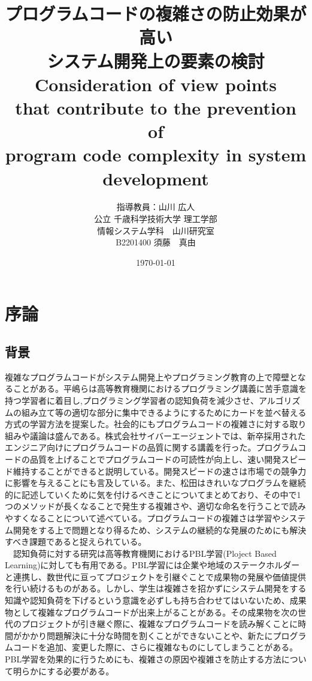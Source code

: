 \documentclass[12pt, a4paper]{jreport}
\begin{document}
    \title{プログラムコードの複雑さの防止効果が高い\\システム開発上の要素の検討\\Consideration of view points\\that contribute to the prevention of\\program code complexity in system development}
    \author{指導教員：山川 広人\\
    公立 千歳科学技術大学 理工学部\\
    情報システム学科　山川研究室\\
B2201400 須藤　真由}
\date{\today}

\maketitle
{}
\tableofcontents
\chapter{序論}

\section{背景}
複雑なプログラムコードがシステム開発上やプログラミング教育の上で障壁となることがある。平嶋ら\cite{haikei}は高等教育機関におけるプログラミング講義に苦手意識を持つ学習者に着目し,プログラミング学習者の認知負荷を減少させ、アルゴリズムの組み立て等の適切な部分に集中できるようにするためにカードを並べ替える方式の学習方法を提案した。社会的にもプログラムコードの複雑さに対する取り組みや議論は盛んである。株式会社サイバーエージェント\cite{CyberZ}では、新卒採用されたエンジニア向けにプログラムコードの品質に関する講義を行った。プログラムコードの品質を上げることでプログラムコードの可読性が向上し、速い開発スピード維持することができると説明している。開発スピードの速さは市場での競争力に影響を与えることにも言及している。また、松田\cite{kireina}はきれいなプログラムを継続的に記述していくために気を付けるべきことについてまとめており、その中で1つのメソッドが長くなることで発生する複雑さや、適切な命名を行うことで読みやすくなることについて述べている。プログラムコードの複雑さは学習やシステム開発をする上で問題となり得るため、システムの継続的な発展のためにも解決すべき課題であると捉えられている。
\\　認知負荷に対する研究は高等教育機関におけるPBL学習(Ploject Based Learning)に対しても有用である。PBL学習には企業や地域のステークホルダーと連携し、数世代に亘ってプロジェクトを引継ぐことで成果物の発展や価値提供を行い続けるものがある。しかし、学生は複雑さを招かずにシステム開発をする知識や認知負荷を下げるという意識を必ずしも持ち合わせてはいないため、成果物として複雑なプログラムコードが出来上がることがある。その成果物を次の世代のプロジェクトが引き継ぐ際に、複雑なプログラムコードを読み解くことに時間がかかり問題解決に十分な時間を割くことができないことや、新たにプログラムコードを追加、変更した際に、さらに複雑なものにしてしまうことがある。PBL学習を効果的に行うためにも、複雑さの原因や複雑さを防止する方法について明らかにする必要がある。
\end{document}
